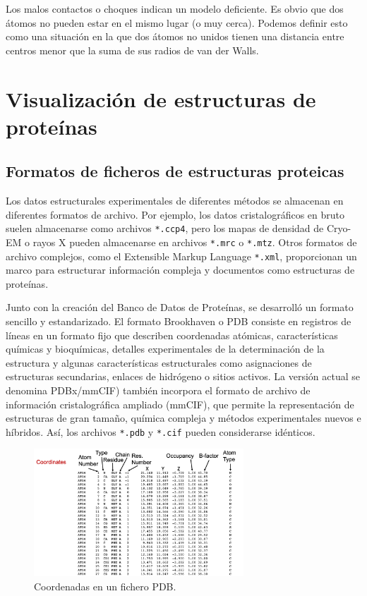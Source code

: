 Los malos contactos o choques indican un modelo deficiente. Es obvio que dos átomos no pueden estar en el mismo lugar (o muy cerca). Podemos definir esto como una situación en la que dos átomos no unidos tienen una distancia entre centros menor que la suma de sus radios de van der Walls.

\section{Visualización de estructuras de proteínas}
\subsection{Formatos de ficheros de estructuras proteicas}
Los datos estructurales experimentales de diferentes métodos se almacenan en diferentes formatos de archivo. Por ejemplo, los datos cristalográficos en bruto suelen almacenarse como archivos \texttt{*.ccp4}, pero los mapas de densidad de Cryo-EM o rayos X pueden almacenarse en archivos \texttt{*.mrc} o \texttt{*.mtz}. Otros formatos de archivo complejos, como el Extensible Markup Language \texttt{*.xml}, proporcionan un marco para estructurar información compleja y documentos como estructuras de proteínas.

Junto con la creación del Banco de Datos de Proteínas, se desarrolló un formato sencillo y estandarizado. El formato Brookhaven o PDB consiste en registros de líneas en un formato fijo que describen coordenadas atómicas, características químicas y bioquímicas, detalles experimentales de la determinación de la estructura y algunas características estructurales como asignaciones de estructuras secundarias, enlaces de hidrógeno o sitios activos. La versión actual se denomina PDBx/mmCIF) también incorpora el formato de archivo de información cristalográfica ampliado (mmCIF), que permite la representación de estructuras de gran tamaño, química compleja y métodos experimentales nuevos e híbridos. Así, los archivos \texttt{*.pdb} y \texttt{*.cif} pueden considerarse idénticos.

\begin{figure}[h]
\centering
\includegraphics[width = 0.7\textwidth]{figs/coordinates-pdb.png}
\caption{Coordenadas en un fichero PDB.}
\end{figure}

